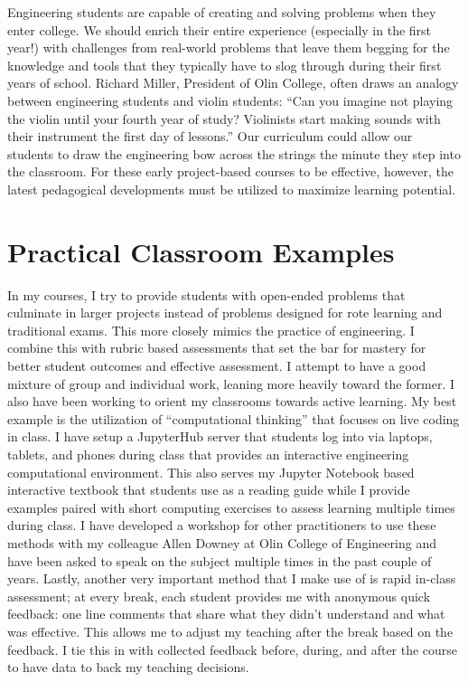 \documentclass{article}
\begin{document}
Engineering students are capable of creating and solving problems when they
enter college. We should enrich their entire experience (especially in the first
year!) with challenges from real-world problems that leave them begging for the
knowledge and tools that they typically have to slog through during their first
years of school. Richard Miller, President of Olin College, often draws an
analogy between engineering students and violin students: ``Can you imagine not
playing the violin until your fourth year of study? Violinists start making
sounds with their instrument the first day of lessons.'' Our curriculum could
allow our students to draw the engineering bow across the strings the minute
they step into the classroom. For these early project-based courses to be
effective, however, the latest pedagogical developments must be utilized to
maximize learning potential.

\section*{Practical Classroom Examples}
%
In my courses, I try to provide students with open-ended problems that
culminate in larger projects instead of problems designed for rote learning and
traditional exams. This more closely mimics the practice of engineering. I
combine this with rubric based assessments that set the bar for mastery for
better student outcomes and effective assessment. I attempt to have a good
mixture of group and individual work, leaning more heavily toward the former. I
also have been working to orient my classrooms towards active learning. My best
example is the utilization of ``computational thinking'' that focuses on live
coding in class. I have setup a JupyterHub server that students log into via
laptops, tablets, and phones during class that provides an interactive
engineering computational environment. This also serves my Jupyter Notebook
based interactive textbook that students use as a reading guide while I provide
examples paired with short computing exercises to assess learning multiple
times during class. I have developed a workshop for other practitioners to use
these methods with my colleague Allen Downey at Olin College of Engineering and
have been asked to speak on the subject multiple times in the past couple of
years. Lastly, another very important method that I make use of is rapid
in-class assessment; at every break, each student provides me with anonymous
quick feedback: one line comments that share what they didn't understand and
what was effective.  This allows me to adjust my teaching after the break based
on the feedback. I tie this in with collected feedback before, during, and
after the course to have data to back my teaching decisions.
\end{document}
